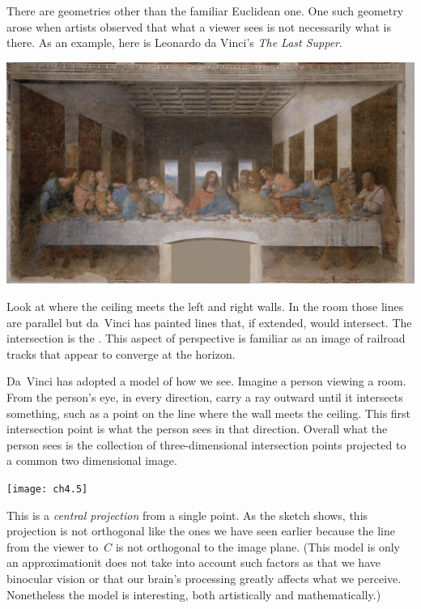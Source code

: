 There are geometries other than the familiar Euclidean one.
One such geometry arose when artists observed
that what a viewer sees is not necessarily what is there.
As an example, here is Leonardo da Vinci's 
\textit{The Last Supper}.
\begin{center} 
  \includegraphics[width=.6\textwidth]{LastSupper.jpg}
\end{center}
Look at where the ceiling meets the left and right walls.
In the room those lines are parallel but 
da~Vinci has painted lines that, if extended, would intersect.
The intersection is the 
.
This aspect of perspective is familiar as an image of 
railroad tracks that appear to converge at the horizon.

Da~Vinci has adopted a model of how we see.
Imagine a person viewing a room.
From the person's eye, in every direction,
carry a ray outward until it intersects something, such
as a point on the line where the wall meets the ceiling.
This first intersection point is what the person sees in that direction.
Overall what the person sees is the collection of three-dimensional
intersection points
projected to a common two dimensional image. 
\begin{center}
  \texttt{[image: ch4.5]}
\end{center}
This is a 
\emph{central projection} 
from a single point.
As the sketch shows, this projection is not orthogonal
like the ones we have seen earlier 
because the line
from the viewer to~$C$ is not orthogonal to the image plane.
(This model is only an approximation\Dash it does not take into
account such factors as
that we have binocular vision or that our brain's processing 
greatly affects what we perceive. 
Nonetheless the model is interesting,
both artistically and mathematically.)

